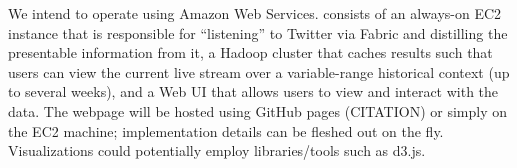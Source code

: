 We intend to operate using Amazon Web Services. \sys consists of an always-on EC2 instance that is responsible for 
``listening'' to Twitter via Fabric and distilling the presentable information from it, a Hadoop cluster that caches 
results such that users can view the current live stream over a variable-range historical context (up to several weeks),
and a Web UI that allows users to view and interact with the data. The webpage will be hosted using GitHub pages (CITATION)
or simply on the EC2 machine; implementation details can be fleshed out on the fly. Visualizations could potentially
employ libraries/tools such as d3.js. 